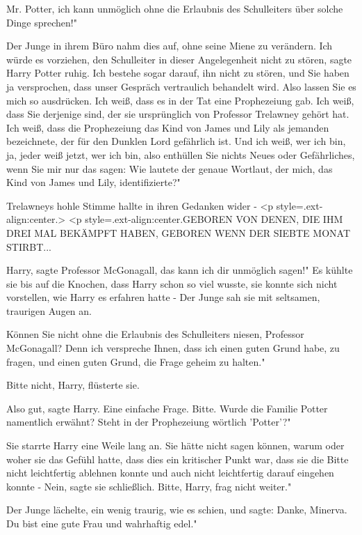 \glqq{}Mr. Potter, ich kann unmöglich ohne die Erlaubnis des Schulleiters über
solche Dinge sprechen!"

Der Junge in ihrem Büro nahm dies auf, ohne seine Miene zu verändern. \glqq{}Ich
würde es vorziehen, den Schulleiter in dieser Angelegenheit nicht zu
stören\grqq{}, sagte Harry Potter ruhig. \glqq{}Ich bestehe sogar darauf, ihn
nicht zu stören, und Sie haben ja versprochen, dass unser Gespräch vertraulich
behandelt wird. Also lassen Sie es mich so ausdrücken. Ich weiß, dass es in der
Tat eine Prophezeiung gab. Ich weiß, dass Sie derjenige sind, der sie
ursprünglich von Professor Trelawney gehört hat. Ich weiß, dass die Prophezeiung
das Kind von James und Lily als jemanden bezeichnete, der für den Dunklen Lord
gefährlich ist. Und ich weiß, wer ich bin, ja, jeder weiß jetzt, wer ich bin,
also enthüllen Sie nichts Neues oder Gefährliches, wenn Sie mir nur das sagen:
Wie lautete der genaue Wortlaut, der mich, das Kind von James und Lily,
identifizierte?"

Trelawneys hohle Stimme hallte in ihren Gedanken wider - <p
style=\grqq{}.ext-align:center\grqq{}.> <p
style=\grqq{}.ext-align:center\grqq{}.GEBOREN VON DENEN, DIE IHM DREI MAL
BEKÄMPFT HABEN, GEBOREN WENN DER SIEBTE MONAT STIRBT...

\glqq{}Harry\grqq{}, sagte Professor McGonagall, \glqq{}das kann ich dir unmöglich
sagen!" Es kühlte sie bis auf die Knochen, dass Harry schon so viel wusste, sie
konnte sich nicht vorstellen, wie Harry es erfahren hatte - Der Junge sah sie
mit seltsamen, traurigen Augen an.

\glqq{}Können Sie nicht ohne die Erlaubnis des Schulleiters niesen, Professor
McGonagall? Denn ich verspreche Ihnen, dass ich einen guten Grund habe, zu
fragen, und einen guten Grund, die Frage geheim zu halten."

\glqq{}Bitte nicht, Harry\grqq{}, flüsterte sie.

\glqq{}Also gut\grqq{}, sagte Harry. \glqq{}Eine einfache Frage. Bitte. Wurde die
Familie Potter namentlich erwähnt? Steht in der Prophezeiung wörtlich 'Potter'?"

Sie starrte Harry eine Weile lang an. Sie hätte nicht sagen können, warum oder
woher sie das Gefühl hatte, dass dies ein kritischer Punkt war, dass sie die
Bitte nicht leichtfertig ablehnen konnte und auch nicht leichtfertig darauf
eingehen konnte - \glqq{}Nein\grqq{}, sagte sie schließlich. \glqq{}Bitte, Harry,
frag nicht weiter."

Der Junge lächelte, ein wenig traurig, wie es schien, und sagte: \glqq{}Danke,
Minerva. Du bist eine gute Frau und wahrhaftig edel."

